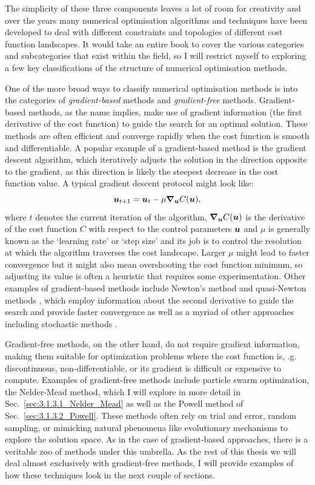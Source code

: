 The simplicity of these three components leaves a lot of room for creativity and over the years many numerical optimisation algorithms and techniques have been developed to deal with different constraints and topologies of different cost function landscapes. It would take an entire book to cover the various categories and subcategories that exist within the field, so I will restrict myself to exploring a few key classifications of the structure of numerical optimisation methods. 

One of the more broad ways to classify numerical optimisation methods is into the categories of \emph{gradient-based} methods and \emph{gradient-free} methods. Gradient-based methods, as the name implies, make use of gradient information (the first derivative of the cost function) to guide the search for an optimal solution. These methods are often efficient and converge rapidly when the cost function is smooth and differentiable. A popular example of a gradient-based method is the gradient descent algorithm, which iteratively adjusts the solution in the direction opposite to the gradient, as this direction is likely the steepest decrease in the cost function value. A typical gradient descent protocol might look like:
\begin{equation}\label{eq:gradient_descent}
    \boldsymbol{u}_{t + 1} = \boldsymbol{u}_t - \mu \grad_{\boldsymbol{u}} C(\boldsymbol{u}),
\end{equation}
where $t$ denotes the current iteration of the algorithm, $\grad_{\boldsymbol{u}} C(\boldsymbol{u})$ is the derivative of the cost function $C$ with respect to the control parameters $\boldsymbol{u}$ and $\mu$ is generally known as the `learning rate' or `step size' and its job is to control the resolution at which the algorithm traverses the cost landscape. Larger $\mu$ might lead to faster convergence but it might also mean overshooting the cost function minimum, so adjusting its value is often a heuristic that requires some experimentation. Other examples of gradient-based methods include Newton's method and quasi-Newton methods \cite{suli_introduction_2003}, which employ information about the second derivative to guide the search and provide faster convergence as well as a myriad of other approaches including stochastic methods \cite{bottou_tradeoffs_2007}. 

Gradient-free methods, on the other hand, do not require gradient information, making them suitable for optimization problems where the cost function is, \@e.g.~ discontinuous, non-differentiable, or its gradient is difficult or expensive to compute. Examples of gradient-free methods include particle swarm optimization\cite{bonyadi_particle_2017}, the Nelder-Mead method, which I will explore in more detail in Sec.~\ref{sec:3.1.3.1_Nelder_Mead} as well as the Powell method of Sec.~\ref{sec:3.1.3.2_Powell}. These methods often rely on trial and error, random sampling, or mimicking natural phenomena like evolutionary mechanisms\cite{vikhar_evolutionary_2016} to explore the solution space. As in the case of gradient-based approaches, there is a veritable zoo of methods under this umbrella. As the rest of this thesis we will deal almost exclusively with gradient-free methods, I will provide examples of how these techniques look in the next couple of sections.

